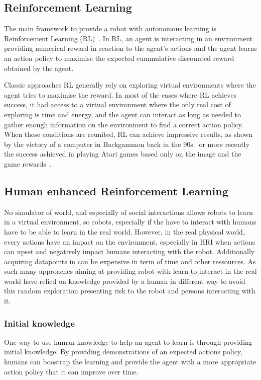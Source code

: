 \documentclass[letterpaper]{article} %
\begin{document}
\subsection{Reinforcement Learning}

The main framework to provide a robot with autonomous learning is Reinforcement
Learning (RL)~\cite{kober2013reinforcement,sutton1998reinforcement}. In RL, an
agent is interacting in an environment
providing numerical reward in reaction to the agent's actions and
the agent learns an action policy to maximise the expected cummulative discounted
reward obtained by the agent.

Classic approaches RL generally rely on exploring virtual environments where the agent
tries to maximise the reward. In most of the cases where RL achieves success, it
had access to a virtual environment where the only real cost of exploring is
time and energy, and the agent can interact as long as needed to gather
enough information on the environment to find a correct action policy. When
these conditions are reunited, RL can achieve impressive results, as shown by
the victory of a computer in Backgammon back in the 90s~\cite{tesauro1995temporal} or more recently the success achieved in playing
Atari games based only on the image and the game rewards~\cite{mnih2015human}.

\subsection{Human enhanced Reinforcement Learning}

No simulator of world, and especially of social interactions allows robots to 
learn in a virtual environment, so robots, especially if the have to interact
with humans have to be able to learn in the real world.
However, in the real physical world, every actions have an impact on the
environment, especially in HRI when actions can upset and negatively impact
humans interacting with the robot. Additionally acquiring datapoints in can be
expensive in term of time and other ressources. As such many approaches aiming
at providing robot with learn to interact in the real world have relied on
knowledge provided by a human in different way to avoid this random exploration
presenting risk to the robot and persons interacting with it.

\subsubsection{Initial knowledge}
One way to use human knowledge to help an agent to learn is through providing
initial knowledge. By providing demonstrations of an expected actions policy,
humans can boostrap the learning and provide the agent with a more appropriate
action policy that it can improve over time. 
\end{document}
